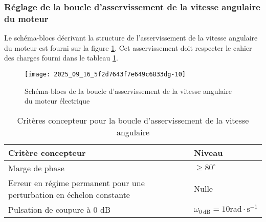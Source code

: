 \ifprof
\begin{corrige}
\end{corrige}
\else
\fi



%
\subsubsection{Réglage de la boucle d'asservissement de la vitesse angulaire du moteur}%
Le schéma-blocs décrivant la structure de l'asservissement de la vitesse angulaire du moteur est fourni sur la figure \ref{ccs_mp_2023_fig_12}. Cet asservissement doit respecter le cahier des charges fourni dans le tableau \ref{ccs_mp_2023_tab_04}.



\begin{figure}[!h]
\centering
\texttt{[image: 2025\_09\_16\_5f2d7643f7e649c6833dg-10]}
\caption{\label{ccs_mp_2023_fig_12}  Schéma-blocs de la boucle d'asservissement de la vitesse angulaire du moteur électrique}
\end{figure}



\begin{table}[h]
\begin{center}
\begin{tabular}{|l|l|}
\hline
Critère concepteur & Niveau \\
\hline
Marge de phase & $\geqslant 80^{\circ}$ \\
\hline
Erreur en régime permanent pour une perturbation en échelon constante & Nulle \\
\hline
Pulsation de coupure à 0 dB & $\omega_{0 \mathrm{~dB}}=10 \mathrm{rad} \cdot \mathrm{s}^{-1}$ \\
\hline
\end{tabular}
\caption{\label{ccs_mp_2023_tab_04}Critères concepteur pour la boucle d'asservissement de la vitesse angulaire}
\end{center}
\end{table}

